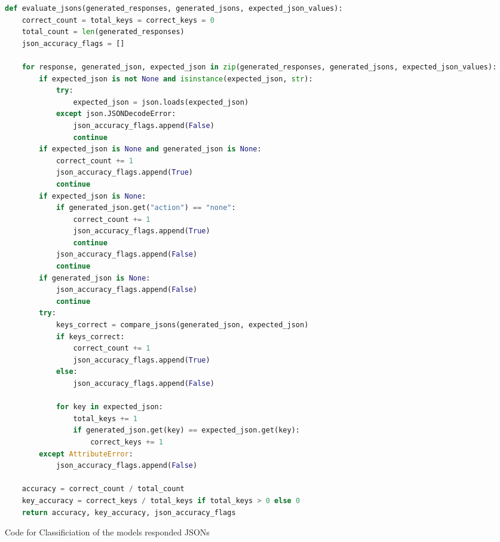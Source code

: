 \begin{Listing}
    \begin{lstlisting}[language=Python]
def evaluate_jsons(generated_responses, generated_jsons, expected_json_values):
    correct_count = total_keys = correct_keys = 0
    total_count = len(generated_responses)
    json_accuracy_flags = []

    for response, generated_json, expected_json in zip(generated_responses, generated_jsons, expected_json_values):
        if expected_json is not None and isinstance(expected_json, str):
            try:
                expected_json = json.loads(expected_json)
            except json.JSONDecodeError:
                json_accuracy_flags.append(False)
                continue        
        if expected_json is None and generated_json is None:
            correct_count += 1
            json_accuracy_flags.append(True)
            continue
        if expected_json is None:
            if generated_json.get("action") == "none": 
                correct_count += 1
                json_accuracy_flags.append(True)
                continue
            json_accuracy_flags.append(False)
            continue        
        if generated_json is None:
            json_accuracy_flags.append(False)
            continue
        try:
            keys_correct = compare_jsons(generated_json, expected_json)
            if keys_correct:
                correct_count += 1
                json_accuracy_flags.append(True)
            else:
                json_accuracy_flags.append(False)
            
            for key in expected_json:
                total_keys += 1
                if generated_json.get(key) == expected_json.get(key):
                    correct_keys += 1
        except AttributeError:
            json_accuracy_flags.append(False)
    
    accuracy = correct_count / total_count
    key_accuracy = correct_keys / total_keys if total_keys > 0 else 0
    return accuracy, key_accuracy, json_accuracy_flags
  \end{lstlisting}
    \caption{Code for Classificiation of the models responded JSONs}
    \label{lst:evalMetrics1}
\end{Listing}

